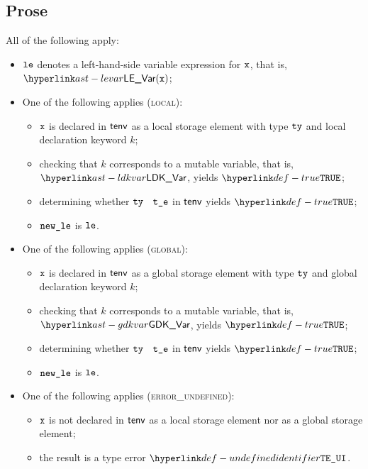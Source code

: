 \subsection{Prose}
All of the following apply:
\begin{itemize}
  \item $\texttt{le}$ denotes a left-hand-side variable expression for $\texttt{x}$, that is, $\LEVar(\vx)$;
  \item One of the following applies (\textsc{local}):
  \begin{itemize}
    \item $\texttt{x}$ is declared in $\textsf{tenv}$ as a local storage element with type $\texttt{ty}$ and local declaration keyword $k$;
    \item checking that $k$ corresponds to a mutable variable, that is, $\LDKVar$, yields $\True$\ProseTerminateAs{\AssignmentToImmutable};
    \item determining whether $\texttt{ty}$ \typesatisfies\ $\texttt{t\_e}$ in $\textsf{tenv}$ yields $\True$\ProseOrTypeError;
    \item $\texttt{new\_le}$ is $\texttt{le}$.
  \end{itemize}

  \item One of the following applies (\textsc{global}):
  \begin{itemize}
    \item $\texttt{x}$ is declared in $\textsf{tenv}$ as a global storage element with type $\texttt{ty}$ and global declaration keyword $k$;
    \item checking that $k$ corresponds to a mutable variable, that is, $\GDKVar$, yields $\True$\ProseTerminateAs{\AssignmentToImmutable};
    \item determining whether $\texttt{ty}$ \typesatisfies\ $\texttt{t\_e}$ in $\textsf{tenv}$ yields $\True$\ProseOrTypeError;
    \item $\texttt{new\_le}$ is $\texttt{le}$.
  \end{itemize}

  \item One of the following applies (\textsc{error\_undefined}):
  \begin{itemize}
    \item $\texttt{x}$ is not declared in $\textsf{tenv}$ as a local storage element nor as a global storage element;
    \item the result is a type error $\UndefinedIdentifier$.
  \end{itemize}
\end{itemize}


